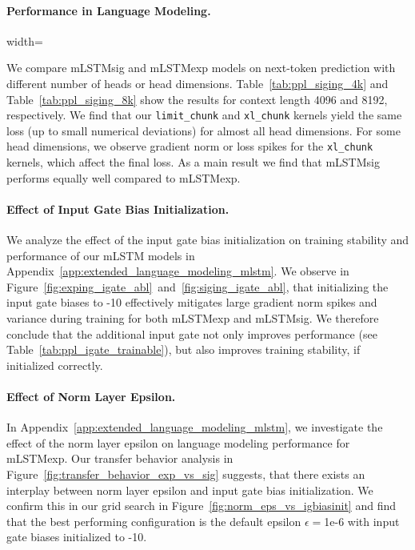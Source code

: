 \documentclass{article}
\begin{document}
\paragraph{Performance in Language Modeling.}
\begin{table}
    \vspace{-0.5cm}
    \centering
    \caption{Validation Perplexity at {context length 4096}. \textsc{EXP} and \textsc{SIG} denote mLSTMexp and mLSTMsig. \textsc{LIMIT} and \textsc{XL} correspond to \texttt{limit\_chunk} and \texttt{xl\_chunk} kernels.}
    \vspace{-0.1cm}
    \begin{adjustbox}{width=\linewidth}
            
    \end{adjustbox}
    \label{tab:ppl_siging_4k}
    \vspace{-0.4cm}
\end{table}
We compare mLSTMsig and mLSTMexp models on next-token prediction with different number of heads or head dimensions.
Table~\ref{tab:ppl_siging_4k} and Table~\ref{tab:ppl_siging_8k} show the results for context length 4096 and 8192, respectively.
We find that our \texttt{limit\_chunk} and \texttt{xl\_chunk} kernels yield the same loss (up to small numerical deviations) for almost all head dimensions.
For some head dimensions, we observe gradient norm or loss spikes for the \texttt{xl\_chunk} kernels, which affect the final loss. %
As a main result we find that mLSTMsig performs equally well compared to mLSTMexp.

\paragraph{Effect of Input Gate Bias Initialization.}
\hspace{-0.0cm}
We analyze the effect of the input gate bias initialization on training stability and performance of our mLSTM models in Appendix~\ref{app:extended_language_modeling_mlstm}.
We observe in Figure~\ref{fig:exping_igate_abl}~and~\ref{fig:siging_igate_abl}, that initializing the input gate biases to -10 effectively mitigates large gradient norm spikes and variance during training for both mLSTMexp and mLSTMsig.
We therefore conclude that the additional input gate not only improves performance (see Table~\ref{tab:ppl_igate_trainable}), but also improves training stability, if initialized correctly.
\vspace{-0.2cm}
\paragraph{Effect of Norm Layer Epsilon.}
In Appendix~\ref{app:extended_language_modeling_mlstm}, we investigate the effect of the norm layer epsilon on language modeling performance for mLSTMexp.
Our transfer behavior analysis in Figure~\ref{fig:transfer_behavior_exp_vs_sig} suggests, that there exists an interplay between norm layer epsilon and input gate bias initialization.
We confirm this in our grid search in Figure~\ref{fig:norm_eps_vs_igbiasinit} and find that the best performing configuration is the default epsilon $\epsilon=$1e-6 with input gate biases initialized to -10.
\end{document}
